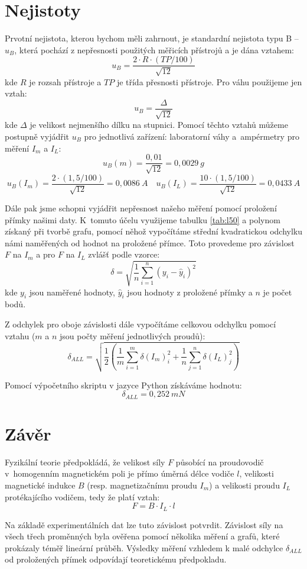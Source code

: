 \documentclass[a4paper,12pt]{article}
\begin{document}
\section{Nejistoty}
Prvotní nejistota, kterou bychom měli zahrnout, je standardní nejistota typu B -- $u_B$, která pochází z nepřesnosti použitých měřicích přístrojů a je dána vztahem:
$$
u_B = \frac{2\cdot R \cdot (TP/100)}{\sqrt{12}}
$$
kde $R$ je rozsah přístroje a $TP$ je třída přesnosti přístroje. Pro váhu použijeme jen vztah:
$$
u_B = \frac{\Delta}{\sqrt{12}}
$$
kde $\Delta$ je velikost nejmenšího dílku na stupnici.
Pomocí těchto vztahů můžeme postupně vyjádřit $u_B$ pro jednotlivá zařízení: laboratorní váhy a~ampérmetry pro měření $I_m$ a $I_L$:
$$
u_B(m) = \frac{0,01}{\sqrt{12}}=0,0029\ g
$$
$$
u_B(I_m) = \frac{2\cdot (1,5/100)}{\sqrt{12}} = 0,0086\ A
\quad
u_B(I_L) = \frac{10\cdot (1,5/100)}{\sqrt{12}} = 0,0433\ A
$$

Dále pak jsme schopni vyjádřit nepřesnost našeho měření pomocí proložení přímky našimi daty. K~tomuto účelu využijeme tabulku \ref{tab:l50} a polynom získaný při tvorbě grafu, pomocí něhož vypočítáme střední kvadratickou odchylku námi naměřených od hodnot na proložené přímce. Toto provedeme pro závislost $F$ na $I_m$ a pro $F$ na $I_L$ zvlášť podle vzorce:
$$
\delta = \sqrt{ \frac{1}{n} \sum_{i=1}^{n} \left( y_i - \hat{y}_i \right)^2 }
$$
kde $y_i$ jsou naměřené hodnoty, $\hat{y}_i$ jsou hodnoty z proložené přímky a $n$ je počet bodů. 

Z odchylek pro oboje závislosti dále vypočítáme celkovou odchylku pomocí vztahu ($m$ a $n$ jsou počty měření jednotlivých proudů):
$$
\delta_{ALL} = \sqrt{ \frac{1}{2} \left( \frac{1}{m} \sum_{i=1}^{m} \delta(I_m)_i^2 + \frac{1}{n} \sum_{j=1}^{n} \delta(I_L)_j^2 \right) }
$$

Pomocí výpočetního skriptu v jazyce Python získáváme hodnotu:
$$
\delta_{ALL} = 0,252\ mN
$$
\section{Závěr}
Fyzikální teorie předpokládá, že velikost síly $F$ působící na proudovodič v~homogenním magnetickém poli je přímo úměrná délce vodiče $l$, velikosti magnetické indukce $B$ (resp. magnetizačnímu proudu $I_m$) a velikosti proudu \( I_L \) protékajícího vodičem, tedy že platí vztah:
$$
F = B\cdot I_L\cdot l
$$

Na základě experimentálních dat lze tuto závislost potvrdit. Závislost síly na všech třech proměnných byla ověřena pomocí několika měření a grafů, které prokázaly téměř lineární průběh. Výsledky měření vzhledem k malé odchylce $\delta_{ALL}$ od proložených přímek odpovídají teoretickému předpokladu.
\end{document}
